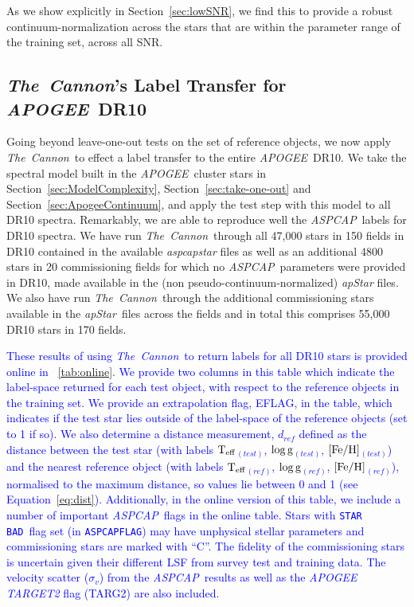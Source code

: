 \documentclass[12pt, preprint]{aastex}
\newcommand{\sectionname}{Section}
\newcommand{\tc}{\textsl{The~Cannon}}
\newcommand{\apogee}{\textsl{APOGEE}}
\newcommand{\aspcap}{\textsl{ASPCAP}}
\newcommand{\badstar}{\texttt{STAR BAD}}
\newcommand{\aspcapflag}{\texttt{ASPCAPFLAG}}
\newcommand{\apstar}{\textsl{apStar}}
\newcommand{\teff}{\mbox{$\rm T_{eff}$}}
\newcommand{\feh}{\mbox{$\rm [Fe/H]$}}
\newcommand{\logg}{\mbox{$\rm \log g$}}
\begin{document}
As we show explicitly in \sectionname~\ref{sec:lowSNR}, we find this to provide a robust continuum-normalization across the stars that are within the parameter range of the training set, across all SNR. 

\subsection{\tc 's Label Transfer for \apogee\ DR10}
\label{sec:APOGEE_DR10_comparison}

Going beyond leave-one-out tests on the set of reference objects, we now apply \tc\ to effect a label transfer to the entire \apogee\ DR10.
We take the spectral model built in the \apogee\ cluster stars in \sectionname~\ref{sec:ModelComplexity}, \sectionname~\ref{sec:take-one-out} and \sectionname~\ref{sec:ApogeeContinuum},
and apply the test step with this model to all DR10 spectra.
Remarkably, we are able to reproduce well the \aspcap\ labels for DR10 spectra. We have run \tc\ through all 47,000 stars in 150 fields in DR10 contained in the available \textit{aspcapstar} files as well as an additional 4800 stars in 20 commissioning fields for which no \aspcap\ parameters were provided in DR10, 
made available in the (non pseudo-continuum-normalized) \textit{apStar} files. 
We also have run \tc\ through the additional commissioning stars available in the \apstar\ files across the fields and in total this
 comprises 55,000 DR10 stars in 170 fields. 

\textcolor{blue}{These results of using \tc\ to return labels for all DR10 stars is provided online in \tablename~\ref{tab:online}. 
We provide two columns in this table which indicate the label-space returned for each test object, with respect to the reference objects in the training set. We provide an extrapolation flag, EFLAG, in the table, which indicates if the test star lies outside of the label-space of the reference objects (set to 1 if so). We also determine a distance measurement, $d_{{ref}}$ defined as the distance between the test star (with labels  \teff$_{(test)}$,  \logg$_{(test)}$, \feh$_{(test)}$) and the nearest reference object (with labels \teff$_{(ref)}$,  \logg$_{(ref)}$, \feh$_{(ref)}$), normalised to the maximum distance, so values lie between 0 and 1 (see Equation~\ref{eq:dist}).
Additionally, in the online version of this table, we include a number of  important \aspcap\ flags in the online table. Stars with \badstar\ flag set (in \aspcapflag) may have unphysical stellar parameters and commissioning stars are marked with ``C''. The fidelity of the commissioning stars is uncertain given their different LSF from survey test and training data. The velocity scatter ($\sigma_v$) from the \aspcap\ results as well as the \textit{APOGEE TARGET2} flag (TARG2) are also included. }
\end{document}
